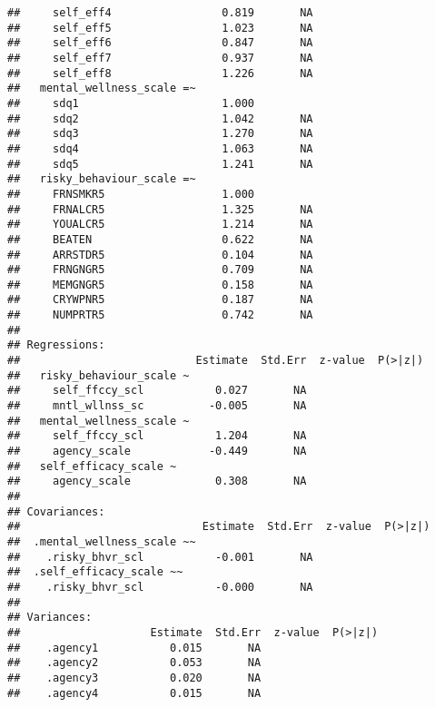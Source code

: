 \documentclass[9pt,]{article}
\begin{document}
\begin{verbatim}
##     self_eff4                 0.819       NA                  
##     self_eff5                 1.023       NA                  
##     self_eff6                 0.847       NA                  
##     self_eff7                 0.937       NA                  
##     self_eff8                 1.226       NA                  
##   mental_wellness_scale =~                                    
##     sdq1                      1.000                           
##     sdq2                      1.042       NA                  
##     sdq3                      1.270       NA                  
##     sdq4                      1.063       NA                  
##     sdq5                      1.241       NA                  
##   risky_behaviour_scale =~                                    
##     FRNSMKR5                  1.000                           
##     FRNALCR5                  1.325       NA                  
##     YOUALCR5                  1.214       NA                  
##     BEATEN                    0.622       NA                  
##     ARRSTDR5                  0.104       NA                  
##     FRNGNGR5                  0.709       NA                  
##     MEMGNGR5                  0.158       NA                  
##     CRYWPNR5                  0.187       NA                  
##     NUMPRTR5                  0.742       NA                  
## 
## Regressions:
##                           Estimate  Std.Err  z-value  P(>|z|)
##   risky_behaviour_scale ~                                    
##     self_ffccy_scl           0.027       NA                  
##     mntl_wllnss_sc          -0.005       NA                  
##   mental_wellness_scale ~                                    
##     self_ffccy_scl           1.204       NA                  
##     agency_scale            -0.449       NA                  
##   self_efficacy_scale ~                                      
##     agency_scale             0.308       NA                  
## 
## Covariances:
##                            Estimate  Std.Err  z-value  P(>|z|)
##  .mental_wellness_scale ~~                                    
##    .risky_bhvr_scl           -0.001       NA                  
##  .self_efficacy_scale ~~                                      
##    .risky_bhvr_scl           -0.000       NA                  
## 
## Variances:
##                    Estimate  Std.Err  z-value  P(>|z|)
##    .agency1           0.015       NA                  
##    .agency2           0.053       NA                  
##    .agency3           0.020       NA                  
##    .agency4           0.015       NA                  

\end{verbatim}
\end{document}

